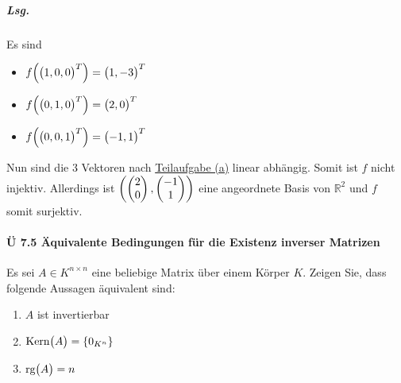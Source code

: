 \documentclass{scrreprt}
\begin{document}
\begin{enumerate}[(a)]
  \subparagraph{Lsg.} Es sind
  \begin{itemize}
  \item $f\qty(\qty\big(1, 0, 0)^T) = \qty\big(1, -3)^T$
  \item $f\qty(\qty\big(0, 1, 0)^T) = \qty\big(2, 0)^T$
  \item $f\qty(\qty\big(0, 0, 1)^T) = \qty\big(-1, 1)^T$
  \end{itemize}
  Nun sind die 3 Vektoren nach \hyperref[7_4_a]{Teilaufgabe (a)} linear
  abhängig.
  Somit ist $f$ nicht injektiv.
  Allerdings ist $\qty(\begin{pmatrix}2 \\ 0 \end{pmatrix},
  \begin{pmatrix} -1 \\ 1 \end{pmatrix})$ eine angeordnete Basis von
  $\mathbb{R}^2$ und $f$ somit surjektiv.
\end{enumerate}

\paragraph{Ü 7.5 Äquivalente Bedingungen für die Existenz inverser Matrizen}

\label{7_5}
Es sei $A \in K^{n \times n}$ eine beliebige Matrix über einem Körper $K$.
Zeigen Sie, dass folgende Aussagen äquivalent sind:
\begin{enumerate}[(1)]
\item $A$ ist invertierbar
\item $\text{Kern}\qty\big(A) = \qty{0_{K^n}}$
\item $\text{rg}\qty\big(A) = n$
\end{enumerate}
\end{document}
